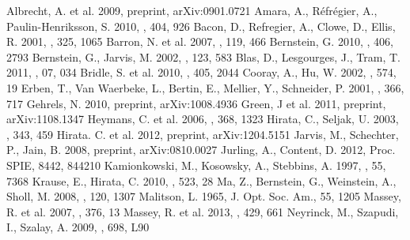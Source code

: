 \begin{thebibliography}{}
  Albrecht, A. et al. 2009, preprint, arXiv:0901.0721
  Amara, A., R\'efr\'egier, A., Paulin-Henriksson, S. 2010, \mnras, 404, 926
  Bacon, D., Refregier, A., Clowe, D., Ellis, R. 2001, \mnras, 325, 1065
  Barron, N. et al. 2007, \pasp, 119, 466
  Bernstein, G. 2010, \mnras, 406, 2793
  Bernstein, G., Jarvis, M. 2002, \aj, 123, 583
  Blas, D., Lesgourges, J., Tram, T. 2011, \jcap, 07, 034
  Bridle, S. et al. 2010, \mnras, 405, 2044
  Cooray, A., Hu, W. 2002, \apj, 574, 19
  Erben, T., Van Waerbeke, L., Bertin, E., Mellier, Y., Schneider, P. 2001, \aap, 366, 717
  Gehrels, N. 2010, preprint, arXiv:1008.4936
  Green, J et al. 2011, preprint, arXiv:1108.1347
  Heymans, C. et al. 2006, \mnras, 368, 1323
  Hirata, C., Seljak, U. 2003, \mnras, 343, 459
  Hirata. C. et al. 2012, preprint, arXiv:1204.5151
  Jarvis, M., Schechter, P., Jain, B. 2008, preprint, arXiv:0810.0027
  Jurling, A., Content, D. 2012, Proc. SPIE, 8442, 844210
  Kamionkowski, M., Kosowsky, A., Stebbins, A. 1997, \prd, 55, 7368
  Krause, E., Hirata, C. 2010, \aap, 523, 28
  Ma, Z., Bernstein, G., Weinstein, A., Sholl, M. 2008, \pasp, 120, 1307
  Malitson, L. 1965, J. Opt. Soc. Am., 55, 1205
  Massey, R. et al. 2007, \mnras, 376, 13
  Massey, R. et al. 2013, \mnras, 429, 661
  Neyrinck, M., Szapudi, I., Szalay, A. 2009, \apj, 698, L90

\end{thebibliography}
